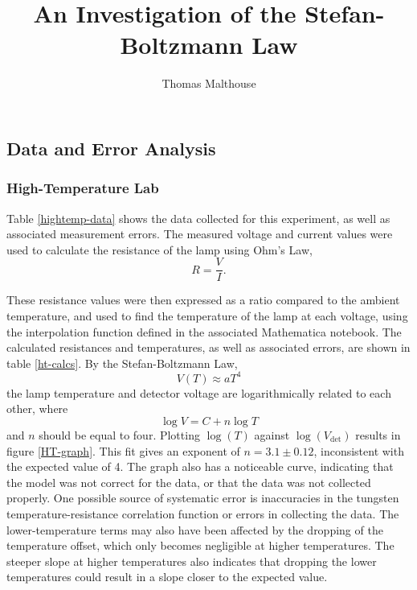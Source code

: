 \documentclass[%
 reprint,
superscriptaddress,
 amsmath,amssymb,
 aps,
]{revtex4-1}
\begin{document}

\title{An Investigation of the Stefan-Boltzmann Law}%

\author{Thomas Malthouse}



\maketitle

\subsection{Data and Error Analysis}

\subsubsection{High-Temperature Lab}


Table \ref{hightemp-data} shows the data collected for this experiment, as well as associated measurement errors. The measured voltage and current values were used to calculate the resistance of the lamp using Ohm's Law,
\begin{equation}\label{ohms-law}
    R = \frac{V}{I}.
\end{equation}

These resistance values were then expressed as a ratio compared to the ambient temperature, and used to find the temperature of the lamp at each voltage, using the interpolation function defined in the associated Mathematica notebook. The calculated resistances and temperatures, as well as associated errors, are shown in table \ref{ht-calcs}. By the Stefan-Boltzmann Law,
\begin{equation}
    V(T) \approx aT^4
\end{equation}
the lamp temperature and detector voltage are logarithmically related to each other, where
\begin{equation}
    \log V = C + n\log T
\end{equation}
and $n$ should be equal to four. Plotting $\log(T)$ against $\log(V_{\text{det}})$ results in figure \ref{HT-graph}. This fit gives an exponent of $n=3.1\pm0.12$, inconsistent with the expected value of 4. The graph also has a noticeable curve, indicating that the model was not correct for the data, or that the data was not collected properly. One possible source of systematic error is inaccuracies in the tungsten temperature-resistance correlation function or errors in collecting the data. The lower-temperature terms may also have been affected by the dropping of the temperature offset, which only becomes negligible at higher temperatures. The steeper slope at higher temperatures also indicates that dropping the lower temperatures could result in a slope closer to the expected value.
\end{document}
